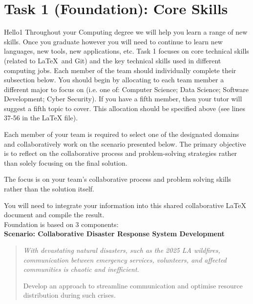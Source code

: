 \documentclass[a4paper, 11pt]{report}
\begin{document}

\tableofcontents





\newpage
\section{Task 1 (Foundation): Core Skills}
Hello1
Throughout your Computing degree we will help you learn a range of new skills. Once you graduate however you will need to continue to learn new languages, new tools, new applications, etc. Task 1 focuses on core technical skills (related to \LaTeX\ and Git) and the key technical skills used in different computing jobs. Each member of the team should individually complete their subsection below. You should begin by allocating to each team member a different major to focus on (i.e. one of: Computer Science; Data Science; Software Development; Cyber Security). If you have a fifth member, then your tutor will suggest a fifth topic to cover. This allocation should be specified above (see lines 37-56 in the LaTeX file).

Each member of your team is required to select one of the designated domains and collaboratively work on the scenario presented below. The primary objective is to reflect on the collaborative process and problem-solving strategies rather than solely focusing on the final solution.

The focus is on your team’s collaborative process and problem solving skills rather than the solution itself. 

You will need to integrate your information into this shared collaborative LaTeX document and compile the result.\\[2mm]

Foundation is based on 3 components:\\[1mm]

\textbf{Scenario: Collaborative Disaster Response System Development}

{\begin{quote}\itshape
With devastating natural disasters, such as the 2025 LA wildfires, communication between emergency services, volunteers, and affected communities is chaotic and inefficient.

Develop an approach to streamline communication and optimise resource distribution during such crises. 
\end{quote}}
\end{document}
